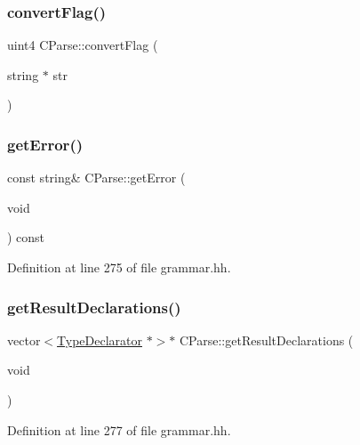 \subsubsection{\texorpdfstring{convertFlag()}{convertFlag()}}
{\footnotesize\ttfamily uint4 C\+Parse\+::convert\+Flag (\begin{DoxyParamCaption}\item[{string $\ast$}]{str }\end{DoxyParamCaption})}

\mbox{\label{class_c_parse_a7541bb4f0e8b8eb2cf95b744f61fa219}} 
\subsubsection{\texorpdfstring{getError()}{getError()}}
{\footnotesize\ttfamily const string\& C\+Parse\+::get\+Error (\begin{DoxyParamCaption}\item[{void}]{ }\end{DoxyParamCaption}) const\hspace{0.3cm}{\ttfamily [inline]}}



Definition at line 275 of file grammar.\+hh.

\mbox{\label{class_c_parse_a6bfe0c19992dba09ecdd7aeda385ab38}} 
\subsubsection{\texorpdfstring{getResultDeclarations()}{getResultDeclarations()}}
{\footnotesize\ttfamily vector$<$\mbox{\hyperlink{class_type_declarator}{Type\+Declarator}} $\ast$$>$$\ast$ C\+Parse\+::get\+Result\+Declarations (\begin{DoxyParamCaption}\item[{void}]{ }\end{DoxyParamCaption})\hspace{0.3cm}{\ttfamily [inline]}}



Definition at line 277 of file grammar.\+hh.

\mbox{\label{class_c_parse_a70098c876c6832ab7f05670eb1d99b37}} 
